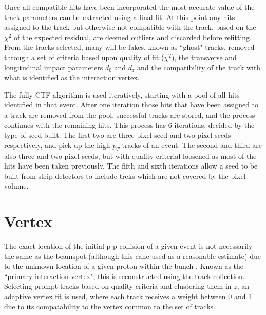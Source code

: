 Once all compatible hits have been incorporated the most accurate value of the track parameters can be extracted using a final fit. At this point any hits assigned to the track but otherwise not compatible with the track, based on the $\chi^{2}$ of the expected residual, are deemed outliers and discarded before refitting. From the tracks selected, many will be fakes, known as ``ghost" tracks, removed through a set of criteria based upon quality of fit ($\chi^{2}$), the transverse and longitudinal impact parameters $d_{0}$ and $d_{z}$ and the compatibility of the track with what is identified as the interaction vertex. 

The fully CTF algorithm is used iteratively, starting with a pool of all hits identified in that event. After one iteration those hits that have been assigned to a track are removed from the pool, successful tracks are stored, and the process continues with the remaining hits. This process has 6 iterations, decided by the type of seed built. The first two are three-pixel seed and two-pixel seeds respectively, and pick up the high $p_{T}$ tracks of an event. The second and third are also three and two pixel seeds, but with quality criterial loosened as most of the hits have been taken previously. The fifth and sixth iterations allow a seed to be built from strip detectors to include treks which are not covered by the pixel volume.

\section{Vertex}

The exact location of the initial p-p collision of a given event is not necessarily the same as the beamspot (although this cane used as a reasonable estimate) due to the unknown location of a given proton within the bunch . Known as the ``primary interaction vertex", this is reconstructed using the track collection. Selecting prompt tracks based on quality criteria and clustering them in $z$, an adaptive vertex fit is used, where each track receives a weight between 0 and 1 due to its compatability to the vertex common to the set of tracks. 


